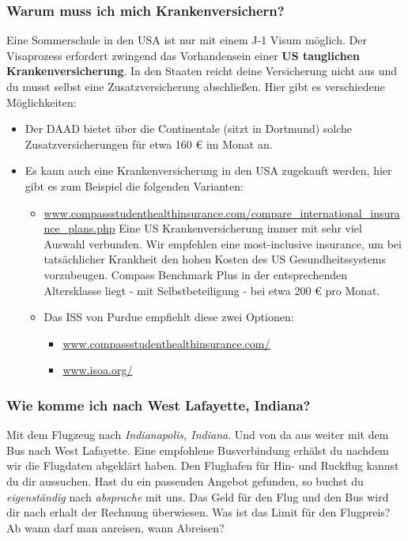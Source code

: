 \documentclass[
  paper=a4,
  fontsize=12pt,
  DIV=16,
  headheight=52pt,
  footheight=45pt,
  headinclude,
  parskip=full,
]{scrartcl}
\begin{document}
\subsubsection*{Warum muss ich mich Krankenversichern?}
Eine Sommerschule in den USA ist nur mit einem J-1 Visum möglich.
Der Visaprozess erfordert zwingend das Vorhandensein einer
\textbf{US tauglichen Krankenversicherung}.
In den Staaten reicht deine Versicherung nicht aus und du musst selbst eine
Zusatzversicherung abschließen.
Hier gibt es verschiedene Möglichkeiten:
\begin{itemize}
  \item Der DAAD bietet über die Continentale (sitzt in Dortmund) solche
  Zusatzversicherungen für etwa 160 € im Monat an.
  \item Es kann auch eine Krankenversicherung in den USA zugekauft werden, hier
  gibt es zum Beispiel die folgenden Varianten:
  \begin{itemize}
    \item \url{www.compassstudenthealthinsurance.com/compare_international_insurance_plans.php}
    Eine US Krankenversicherung immer mit sehr viel Auswahl verbunden.
    Wir empfehlen eine most-inclusive insurance, um bei tatsächlicher Krankheit
    den hohen Kosten des US Gesundheitssystems vorzubeugen.
    Compass Benchmark Plus in der entsprechenden Altersklasse liegt - mit
    Selbstbeteiligung - bei etwa 200 € pro Monat.
    \item Das ISS von Purdue empfiehlt diese zwei Optionen:
    \begin{itemize}
      \item \url{www.compassstudenthealthinsurance.com/}
      \item \url{www.isoa.org/}
    \end{itemize}
  \end{itemize}
\end{itemize}

\subsubsection*{Wie komme ich nach West Lafayette, Indiana?}
Mit dem Flugzeug nach \emph{Indianapolis, Indiana}. Und von da aus weiter mit dem Bus
nach West Lafayette.
Eine empfohlene Busverbindung erhälst du nachdem wir die Flugdaten abgeklärt haben.
Den Flughafen für Hin- und Ruckflug kannst du dir aussuchen.
Hast du ein passenden Angebot gefunden, so buchst du \emph{eigenständig} nach \emph{absprache}
mit uns. Das Geld für den Flug und den Bus wird dir nach erhalt der Rechnung überwiesen.
Was ist das Limit für den Flugpreis?
Ab wann darf man anreisen, wann Abreisen?
\end{document}
